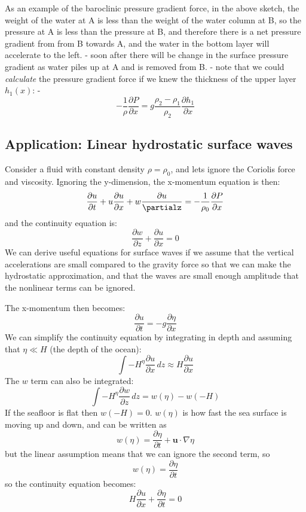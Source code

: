 As an example of the baroclinic pressure gradient force, in the above
sketch, the weight of the water at A is less than the weight of the
water column at B, so the pressure at A is less than the pressure at B,
and therefore there is a net pressure gradient from from B towards A,
and the water in the bottom layer will accelerate to the left. - soon
after there will be change in the surface pressure gradient as water
piles up at A and is removed from B. - note that we could
\emph{calculate} the pressure gradient force if we knew the thickness of
the upper layer \(h_1(x)\): -
\[-\frac{1}{\rho}\frac{\partial P}{\partial x} = g \frac{\rho_2-\rho_1}{\rho_2} \frac{\partial h_1}{\partial x}\]

\subsection{Application: Linear hydrostatic surface
waves}\label{application-linear-hydrostatic-surface-waves}

Consider a fluid with constant density \(\rho=\rho_0\), and lets ignore
the Coriolis force and viscosity. Ignoring the y-dimension, the
x-momentum equation is then:
\[ \frac{\partial u}{\partial t} + u\frac{\partial u}{\partial x} + w\frac{\partial u}{\partialz} = -\frac{1}{\rho_0}\frac{\partial P}{\partial x}\]
and the continuity equation is:
\[ \frac{\partial w}{\partial z} + \frac{\partial u}{\partial x} = 0\]
We can derive useful equations for surface waves if we assume that the
vertical accelerations are small compared to the gravity force so that
we can make the hydrostatic approximation, and that the waves are small
enough amplitude that the nonlinear terms can be ignored.

The x-momentum then becomes:
\[ \frac{\partial u}{\partial t} = -g\frac{\partial \eta}{\partial x}\]
We can simplify the continuity equation by integrating in depth and
assuming that \(\eta \ll H\) (the depth of the ocean):
\[ \int{-H}^{\eta} \frac{\partial u}{\partial x} \, dz \approx H \frac{\partial u}{\partial x}\]
The \(w\) term can also be integrated:
\[ \int{-H}^{\eta} \frac{\partial w}{\partial z} \, dz = w(\eta) - w(-H)\]
If the seafloor is flat then \(w(-H)=0\). \(w(\eta)\) is how fast the
sea surface is moving up and down, and can be written as
\[w(\eta) = \frac{\partial \eta}{\partial t} + \mathbf{u}\cdot\nabla\eta\]
but the linear assumption means that we can ignore the second term, so
\[w(\eta) = \frac{\partial \eta}{\partial t}\] so the continuity
equation becomes:
\[ H \frac{\partial u}{\partial x} + \frac{\partial \eta}{\partial t} = 0\]

